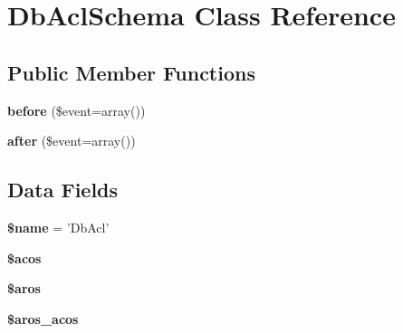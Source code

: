 \hypertarget{class_db_acl_schema}{
\section{DbAclSchema Class Reference}
\label{class_db_acl_schema}
}
\subsection*{Public Member Functions}
\begin{DoxyCompactItemize}
\item 
\hypertarget{class_db_acl_schema_a3520fea3fe761944de85bdb84faff032}{
{\bfseries before} (\$event=array())}
\label{class_db_acl_schema_a3520fea3fe761944de85bdb84faff032}

\item 
\hypertarget{class_db_acl_schema_a39eb72bb9d764d16cdf7fc1e1a84c504}{
{\bfseries after} (\$event=array())}
\label{class_db_acl_schema_a39eb72bb9d764d16cdf7fc1e1a84c504}

\end{DoxyCompactItemize}
\subsection*{Data Fields}
\begin{DoxyCompactItemize}
\item 
\hypertarget{class_db_acl_schema_ab2fc40d43824ea3e1ce5d86dee0d763b}{
{\bfseries \$name} = 'DbAcl'}
\label{class_db_acl_schema_ab2fc40d43824ea3e1ce5d86dee0d763b}

\item 
{\bfseries \$acos}
\item 
{\bfseries \$aros}
\item 
{\bfseries \$aros\_\-acos}
\end{DoxyCompactItemize}


